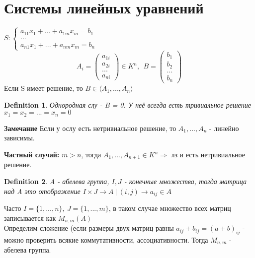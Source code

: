 \documentclass[12pt]{article}
\newtheorem{definition}{Definition}
\begin{document}
\section{Системы линейных уравнений}
$S:\begin{cases}
    a_{11}x_1 + ... + a_{1m}x_m = b_1 \\
    ... \\
    a_{n1}x_1 + ... + a_{nm}x_m = b_n
 \end{cases}$ 
 \\
 $$A_i = \begin{pmatrix}
     a_{1i} \\
     a_{2i} \\
     ... \\
     a_{ni}
 \end{pmatrix} \in K^n, \ \ B = \begin{pmatrix}
     b_1 \\
     b_2 \\
     ... \\
     b_n
 \end{pmatrix}$$ Если S имеет решение, то $B \in \langle A_1, ..., A_n \rangle$
 \\
 \begin{definition}
     Однородная слу - B = 0. У неё всегда есть тривиальное решение $x_1 = x_2 = ... = x_n = 0$
 \end{definition}

 \textbf{Замечание} Если у ослу есть нетривиальное решение, то $A_1, ..., A_n$ - линейно зависимы.

 \textbf{Частный случай:} $m > n$, тогда $A_1, ..., A_{n + 1} \in K^n \Rightarrow$ лз и есть нетривиальное решение.

 \begin{definition}
     A - абелева группа, $I, J$ - конечные множества, тогда матрица над A это отображение $I \times J \rightarrow A \ | \ (i, j) \rightarrow a_{ij} \in A$
 \end{definition}
 Часто $I = \{1, ..., n\}, \ J = \{1, ..., m\}$, в таком случае множество всех матриц записывается как $M_{n,m}(A)$
\\

Определим сложение (если размеры двух матриц равны $a_{ij} + b_{ij} = (a + b)_{ij}$ - можно проверить всякие коммутативности, ассоциативности. Тогда $M_{n,m}$ - абелева группа.
\\
\end{document}
